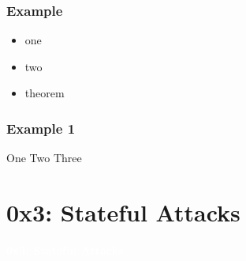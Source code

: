 \documentclass[aspectratio=169]{beamer}
\begin{document}
\begin{frame}
    \frametitle{Example}

    \begin{itemize}
        \item<1-> one
        \item<2-> two
        \item<3-> theorem
    \end{itemize}

\end{frame}

\begin{frame}
    \frametitle{Example 1}
    One \pause
    Two \pause
    Three
\end{frame}

\section{0x3: Stateful Attacks}
{
\begin{frame}
\huge{\textcolor{white}{\textbf{0x3: Stateful Attacks}}}
\end{frame}
}
\end{document}
